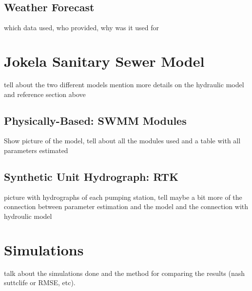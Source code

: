  
\subsection{Weather Forecast}
which data used, who provided, why was it used for

\section{Jokela Sanitary Sewer Model}
tell about the two different models
mention more details on the hydraulic model and reference section above
    
    \subsection{Physically-Based: SWMM Modules}

Show picture of the model, tell about all the modules used and a table with all parameters estimated

    \subsection{Synthetic Unit Hydrograph: RTK}
picture with hydrographs of each pumping station, tell maybe a bit more of the connection between parameter estimation and the model and the connection with hydroulic model



\section{Simulations}

talk about the simulations done and the method for comparing the results (nash suttclife or RMSE, etc). 

